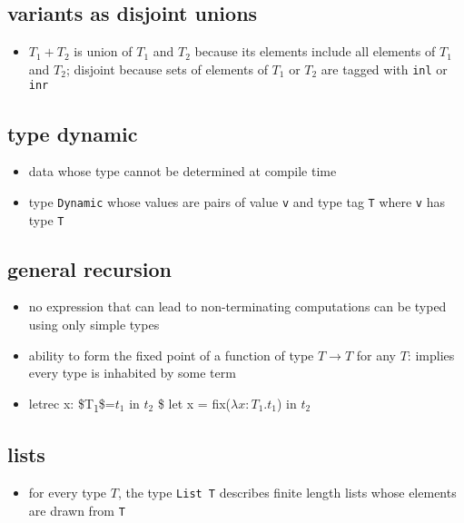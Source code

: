 \documentclass[11pt]{article}
\begin{document}
\subsection{variants as disjoint unions}
\label{sec:org0f5042d}
\begin{itemize}
\item \(T_1 + T_2\) is union of \(T_1\) and \(T_2\) because its elements include all elements of \(T_1\) and \(T_2\); disjoint because sets of elements of \(T_1\) or \(T_2\) are tagged with \texttt{inl} or \texttt{inr}
\end{itemize}

\subsection{type dynamic}
\label{sec:orgab4b802}
\begin{itemize}
\item data whose type cannot be determined at compile time
\item type \texttt{Dynamic} whose values are pairs of value \texttt{v} and type tag \texttt{T} where \texttt{v} has type \texttt{T}
\end{itemize}

\subsection{general recursion}
\label{sec:org17c0fec}
\begin{itemize}
\item no expression that can lead to non-terminating computations can be typed using only simple types
\item ability to form the fixed point of a function of type \(T \rightarrow T\) for any \(T\): implies every type is inhabited by some term
\item letrec x: \$T\textsubscript{1}\$=\(t_1\) in \(t_2\) \$ let x = fix(\(\lambda x : T_1.t_1\)) in \(t_2\)
\end{itemize}

\subsection{lists}
\label{sec:org2449b25}
\begin{itemize}
\item for every type \(T\), the type \texttt{List T} describes finite length lists whose elements are drawn from \texttt{T}
\end{itemize}
\end{document}
